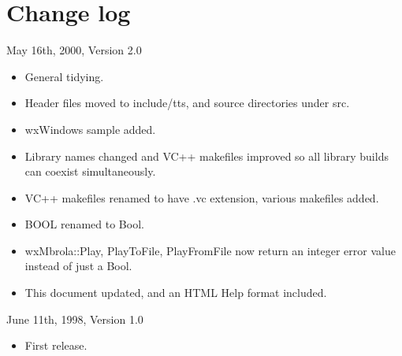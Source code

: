 \chapter{Change log}\label{changes}
%
%
\setfooter{\thepage}{}{}{}{}{\thepage}%

May 16th, 2000, Version 2.0

\begin{itemize}\itemsep=0pt
\item General tidying.
\item Header files moved to include/tts, and source directories under src.
\item wxWindows sample added.
\item Library names changed and VC++ makefiles improved so all library builds can
coexist simultaneously.
\item VC++ makefiles renamed to have .vc extension, various makefiles added.
\item BOOL renamed to Bool.
\item wxMbrola::Play, PlayToFile, PlayFromFile now return an integer error value
instead of just a Bool.
\item This document updated, and an HTML Help format included.
\end{itemize}

June 11th, 1998, Version 1.0

\begin{itemize}\itemsep=0pt
\item First release.
\end{itemize}



